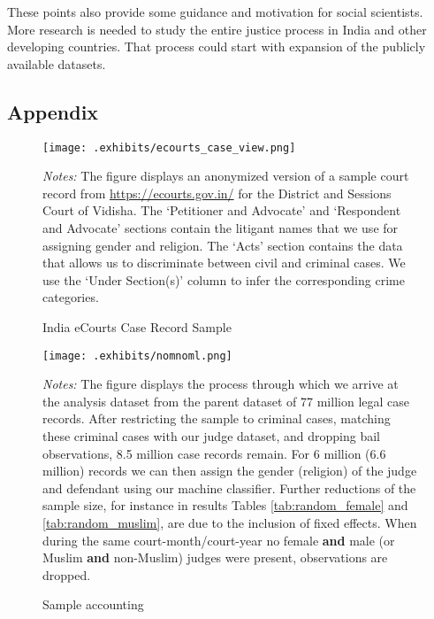 \documentclass[12pt,english]{article}
\begin{document}
These points also provide some guidance and motivation for social scientists. More research is needed to study the entire justice process in India and other developing countries. That process could start with expansion of the publicly available datasets.

\clearpage





\clearpage

 
\begin{appendices}

\setcounter{figure}{0} 
\renewcommand{\thefigure}{A\arabic{figure}} 
\setcounter{table}{0} \renewcommand{\thetable}{A\arabic{table}} 


\section{Appendix}

\begin{figure}[htp!]
 \centering
 \caption{India eCourts Case Record Sample}
 \texttt{[image: .exhibits/ecourts\_case\_view.png]}
 \label{fig:ecourts_case_view}
 \begin{minipage}{1.0\textwidth}
    {\scriptsize \emph{Notes:} The figure displays an anonymized version of a sample court record from \url{https://ecourts.gov.in/} for the District and Sessions Court of Vidisha. The `Petitioner and Advocate' and `Respondent and Advocate' sections contain the litigant names that we use for assigning gender and religion. The `Acts' section contains the data that allows us to discriminate between civil and criminal cases. We use the `Under Section(s)' column to infer the corresponding crime categories.\par}
 \end{minipage}
\end{figure}

\newpage

\begin{figure}[htp!]
 \centering
 \caption{Sample accounting}
 \texttt{[image: .exhibits/nomnoml.png]}
 \label{fig:nomnoml}
 \begin{minipage}{1.0\textwidth}
    {\scriptsize \emph{Notes:} The figure displays the process through which we arrive at the analysis dataset from the parent dataset of 77 million legal case records. After restricting the sample to criminal cases, matching these criminal cases with our judge dataset, and dropping bail observations, 8.5 million case records remain. For 6 million (6.6 million) records we can then assign the gender (religion) of the judge and defendant using our machine classifier. Further reductions of the sample size, for instance in results Tables \ref{tab:random_female} and \ref{tab:random_muslim}, are due to the inclusion of fixed effects. When during the same court-month/court-year no female \textbf{and} male (or Muslim \textbf{and} non-Muslim) judges were present, observations are dropped.\par}
 \end{minipage}
\end{figure}


\end{appendices}
\end{document}
